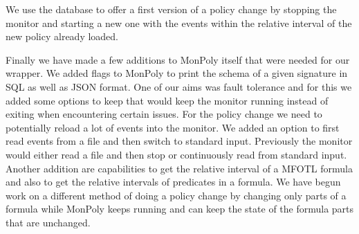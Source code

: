We use the database to offer a first version of a policy change by stopping the monitor and starting a new one with the events within the relative interval of the new policy already loaded.

Finally we have made a few additions to MonPoly itself that were needed for our wrapper.
We added flags to MonPoly to print the schema of a given signature in SQL as well as JSON format.
One of our aims was fault tolerance and for this we added some options to keep that would keep the monitor running instead of exiting when encountering certain issues.
For the policy change we need to potentially reload a lot of events into the monitor.
We added an option to first read events from a file and then switch to standard input.
Previously the monitor would either read a file and then stop or continuously read from standard input.
Another addition are capabilities to get the relative interval of a MFOTL formula and also to get the relative intervals of predicates in a formula.
We have begun work on a different method of doing a policy change by changing only parts of a formula while MonPoly keeps running and can keep the state of the formula parts that are unchanged.


